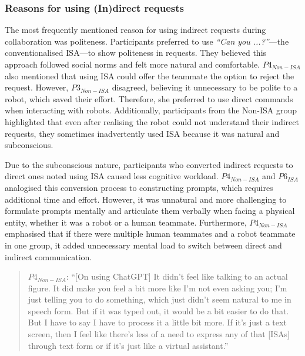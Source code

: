 \subsubsection{Reasons for using (In)direct requests}\label{sec:reason}
The most frequently mentioned reason for using indirect requests during collaboration was politeness. Participants preferred to use \textit{``Can you ...?''}—the conventionalised ISA—to show politeness in requests. They believed this approach followed social norms and felt more natural and comfortable. $P4_{Non-ISA}$ also mentioned that using ISA could offer the teammate the option to reject the request. However, $P3_{Non-ISA}$ disagreed, believing it unnecessary to be polite to a robot, which saved their effort. Therefore, she preferred to use direct commands when interacting with robots. Additionally, participants from the Non-ISA group highlighted that even after realising the robot could not understand their indirect requests, they sometimes inadvertently used ISA because it was natural and subconscious.

Due to the subconscious nature, participants who converted indirect requests to direct ones noted using ISA caused less cognitive workload. $P4_{Non-ISA}$ and $P6_{ISA}$ analogised this conversion process to constructing prompts, which requires additional time and effort. However, it was unnatural and more challenging to formulate prompts mentally and articulate them verbally when facing a physical entity, whether it was a robot or a human teammate. Furthermore, $P4_{Non-ISA}$ emphasised that if there were multiple human teammates and a robot teammate in one group, it added unnecessary mental load to switch between direct and indirect communication.

\begin{quote}
    $P4_{Non-ISA}$: ``[On using ChatGPT] It didn't feel like talking to an actual figure. It did make you feel a bit more like I'm not even asking you; I'm just telling you to do something, which just didn't seem natural to me in speech form. But if it was typed out, it would be a bit easier to do that. But I have to say I have to process it a little bit more. If it's just a text screen, then I feel like there's less of a need to express any of that [ISAs] through text form or if it's just like a virtual assistant.''
\end{quote}

